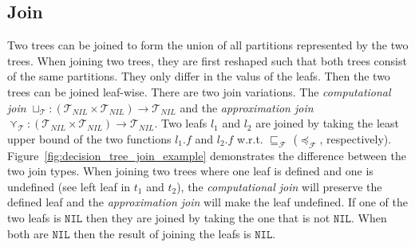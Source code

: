 \documentclass[11pt,a4paper,titlepage]{article}
\theoremstyle{definition}
\begin{document}
\subsection{Join}\label{sec:tree_join}
Two trees can be joined to form the union of all partitions represented by the two trees. When joining two trees, they are first reshaped such
that both trees consist of the same partitions. They only differ in the valus of the leafs. Then the two trees can be joined leaf-wise. 
There are two join variations. 
The \textit{computational join} $\sqcup_{\mathcal{T}} \colon (\mathcal{T}_{NIL} \times \mathcal{T}_{NIL}) \rightarrow \mathcal{T}_{NIL}$
and the \textit{approximation join} $\curlyvee_{\mathcal{T}} \colon (\mathcal{T}_{NIL} \times \mathcal{T}_{NIL}) \rightarrow \mathcal{T}_{NIL}$. 
Two leafs $l_1$ and $l_2$ are joined by taking the least upper bound of the two functions $l_1.f$ and $l_2.f$ 
w.r.t. $\sqsubseteq_{\mathcal{F}}$ ($\preceq_{\mathcal{F}}$, respectively).
Figure~\ref{fig:decision_tree_join_example} demonstrates the difference between the two join types. 
When joining two trees where one leaf is defined and one is undefined 
(see left leaf in $t_1$ and $t_2$), the \textit{computational join} will preserve the defined leaf
and the \textit{approximation join} will make the leaf undefined. If one of the two leafs is $\mathtt{NIL}$ then they are joined by taking the one
that is not $\mathtt{NIL}$. When both are $\mathtt{NIL}$ then the result of joining the leafs is $\mathtt{NIL}$.
\end{document}
